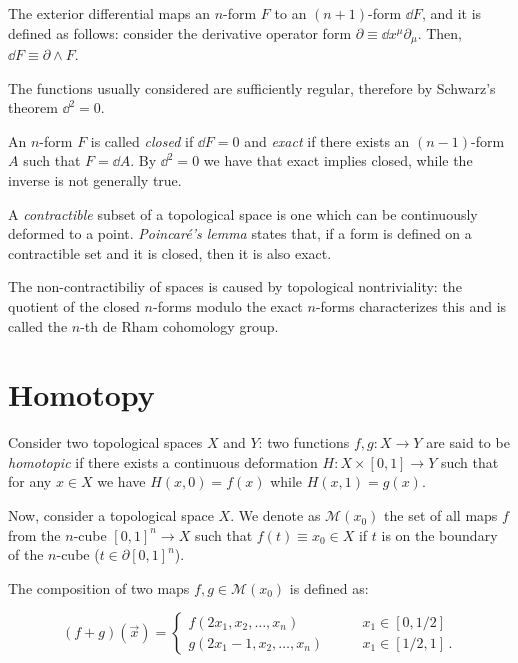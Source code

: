 \documentclass[main.tex]{subfiles}
\begin{document}
The exterior differential maps an \(n\)-form \(F\) to an \((n+1)\)-form \(\dd{F}\), and it is defined as follows:
consider the derivative operator form \(\partial \equiv \dd{x^{\mu}} \partial _\mu\).
Then, \(\dd{F} \equiv \partial \wedge F\).

The functions usually considered are sufficiently regular, therefore by Schwarz's theorem \(\dd^2 = 0\).

An \(n\)-form \(F\) is called \emph{closed} if \(\dd{F}= 0 \) and \emph{exact} if there exists an \((n-1)\)-form \(A\) such that \(F = \dd{A}\).
By \(\dd^2=0\) we have that exact implies closed, while the inverse is not generally true.

A \emph{contractible} subset of a topological space is one which can be continuously deformed to a point.
\emph{Poincaré's lemma} states that, if a form is defined on a contractible set and it is closed, then it is also exact.

The non-contractibiliy of spaces is caused by topological nontriviality: the quotient of the closed \(n\)-forms modulo the exact \(n\)-forms characterizes this and is called the \(n\)-th de Rham cohomology group. 

\section{Homotopy} \label{sec:homotopy}

Consider two topological spaces \(X\) and \(Y\): two functions \(f, g \colon X \rightarrow Y\) are said to be \emph{homotopic} if there exists a continuous deformation \(H \colon X \times [0,1] \rightarrow Y\) such that for any \(x \in X\) we have \(H(x, 0) = f(x)\) while \(H(x, 1) = g(x)\).

Now, consider a topological space \(X\).
We denote  as $\mathcal M(x_0)$ the set of all maps \(f\) from the \(n\)-cube \([0,1]^n \rightarrow X\) such that  \(f(t) \equiv x_0 \in X\) if \(t\) is on the boundary of the \(n\)-cube (\(t\in \partial [0,1]^{n}\)).

The composition of two maps \(f, g \in \mathcal M (x_0)\) is defined as:

\begin{equation}
  (f+g) (\vec{x} ) = \begin{cases}
  f(2x_1, x_2, \dots, x_n) \qquad & x_1 \in [0, 1/2 ] \\
  g(2x_1-1, x_2, \dots, x_n) \qquad & x_1 \in [1/2, 1] \,.
  \end{cases}
\end{equation}
\end{document}

